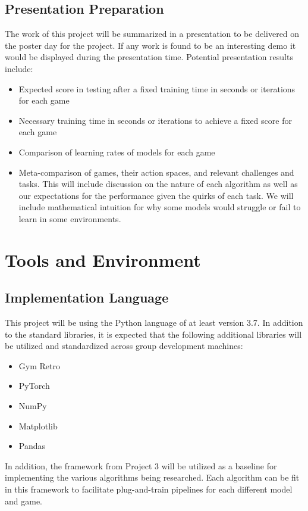 \documentclass[conference]{IEEEtran}
\begin{document}
\subsection{Presentation Preparation}
The work of this project will be summarized in a presentation to be delivered on the poster day for the project.
If any work is found to be an interesting demo it would be displayed during the presentation time. Potential presentation results include:
\begin{itemize}
    \item Expected score in testing after a fixed training time in seconds or iterations for each game
    \item Necessary training time in seconds or iterations to achieve a fixed score for each game
    \item Comparison of learning rates of models for each game
    \item Meta-comparison of games, their action spaces, and relevant challenges and tasks. This will include discussion on the nature of each algorithm as well as our expectations for the performance given the quirks of each task. We will include mathematical intuition for why some models would struggle or fail to learn in some environments.
\end{itemize}

\section{Tools and Environment}

\subsection{Implementation Language}
This project will be using the Python language of at least version 3.7.
In addition to the standard libraries, it is expected that the following additional libraries will be utilized and standardized across group development machines:
 
\begin{itemize}
    \item Gym Retro \cite{nichol2018retro}
    \item PyTorch
    \item NumPy
    \item Matplotlib
    \item Pandas
\end{itemize}

In addition, the framework from Project 3 will be utilized as a baseline for implementing the various algorithms being researched. Each algorithm can be fit in this framework to facilitate plug-and-train pipelines for each different model and game.
\end{document}
